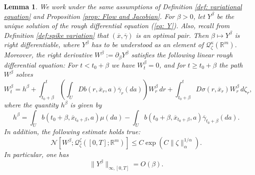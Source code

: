 \documentclass[12pt,reqno]{amsart}
\numberwithin{equation}{section}  %
\newcommand{\1}{{\bf 1}}
\newcommand{\2}{{\bf 2}}
\newcommand{\R}{\mathbb R}
\newcommand{\ga}{\gamma}
\newcommand{\ka}{\kappa}
\newcommand{\lp}{\left(}
\newcommand{\rp}{\right)}
\newtheorem{lemma}[theorem]{Lemma}
\theoremstyle{remark}
\theoremstyle{remark}
\begin{document}
\begin{lemma}\label{Lemma: Y} We work under the same assumptions of Definition \ref{def: variational equation} and Proposition \ref{prop: Flow and Jacobian}. For $\beta>0$, let $Y^{\beta}$ be the unique solution of the rough differential equation (\ref{eq: Y}). Also, recall from Definition \ref{def:spike variation} that $(\overline{x},\overline{\ga})$ is an optimal pair. Then $\beta \mapsto Y^{\beta}$ is right differentiable, where $Y^{\beta}$ has to be understood as an element of $\mathcal{Q}_{\zeta}^{\ka}(\R^m)$. Moreover, the right derivative $W^{\beta}:=\partial_{\beta}Y^{\beta}$ satisfies the following linear rough differential equation: For $t<t_{0}+\beta$ we have $W_{t}^{\beta}=0$, and for $t\geq t_{0}+\beta$ the path $W^{\beta}$ solves
\begin{equation}\label{eq: dynamics_W}
    W^{\beta}_{t}=h^{\beta}+\int_{t_{0}+\beta}^{t}\lp\int_{U}Db(r,\overline{x}_{r},a)\overline{\ga}_{r}(da) \rp W_{r}^{\beta}\,dr +\int_{t_{0}+\beta}^{t}D\sigma(r,\overline{x}_{r})W^{\beta}_{r}\, d\zeta_{r},
\end{equation}
where the quantity $h^{\beta}$ is given by
\begin{equation}
    \label{eq: h_beta}h^{\beta}=\int_{U}b(t_{0}+\beta,\overline{x}_{t_{0}+\beta},a)\mu(da)-\int_{U}b(t_{0}+\beta,\overline{x}_{t_{0}+\beta},a)\overline{\ga}_{t_{0}+\beta}(da).
\end{equation}
In addition, the following estimate holds true:
\begin{equation}\label{eq: estimate_W}
    \mathcal{N}[W^{\beta};\mathcal{Q}_{{\zeta}}^{\zeta}([0,T];\R^m)]\leq C\exp\lp C \|\zeta\|_{\alpha}^{1/\alpha} \rp.
\end{equation}
In particular, one has
\begin{equation}\label{eq: Pontry-2}
\|Y^{\beta}\|_{\infty,[0,T]}=O(\beta). 
\end{equation}
\end{lemma}
\end{document}
